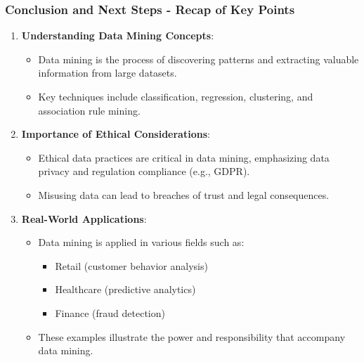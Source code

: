 \documentclass[aspectratio=169]{beamer}
\begin{document}
\begin{frame}[fragile]
    \frametitle{Conclusion and Next Steps - Recap of Key Points}
    \begin{enumerate}
        \item \textbf{Understanding Data Mining Concepts}:
        \begin{itemize}
            \item Data mining is the process of discovering patterns and extracting valuable information from large datasets.
            \item Key techniques include classification, regression, clustering, and association rule mining.
        \end{itemize}

        \item \textbf{Importance of Ethical Considerations}:
        \begin{itemize}
            \item Ethical data practices are critical in data mining, emphasizing data privacy and regulation compliance (e.g., GDPR).
            \item Misusing data can lead to breaches of trust and legal consequences.
        \end{itemize}

        \item \textbf{Real-World Applications}:
        \begin{itemize}
            \item Data mining is applied in various fields such as:
            \begin{itemize}
                \item Retail (customer behavior analysis)
                \item Healthcare (predictive analytics)
                \item Finance (fraud detection)
            \end{itemize}
            \item These examples illustrate the power and responsibility that accompany data mining.
        \end{itemize}
    \end{enumerate}
\end{frame}
\end{document}
